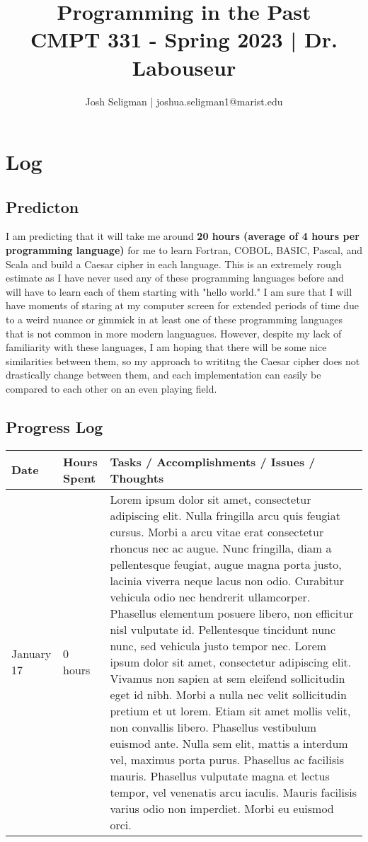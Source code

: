 \documentclass[letterpaper, 10pt, DIV=13]{scrartcl}
\title {
	\normalfont
	\huge{Programming in the Past} \\
	\vspace{10pt}
	\large{CMPT 331 - Spring 2023 | Dr. Labouseur}
}
\author{\normalfont Josh Seligman | joshua.seligman1@marist.edu}
\numberwithin{equation}{section}
\numberwithin{figure}{section}
\numberwithin{table}{section}
\begin{document}
\maketitle

\section{Log}
\subsection{Predicton}
I am predicting that it will take me around \textbf{20 hours (average of 4 hours per programming language)} for me to learn Fortran, COBOL, BASIC, Pascal, and Scala and build a Caesar cipher in each language. This is an extremely rough estimate as I have never used any of these programming languages before and will have to learn each of them starting with "hello world." I am sure that I will have moments of staring at my computer screen for extended periods of time due to a weird nuance or gimmick in at least one of these programming languages that is not common in more modern languagues. However, despite my lack of familiarity with these languages, I am hoping that there will be some nice similarities between them, so my approach to writitng the Caesar cipher does not drastically change between them, and each implementation can easily be compared to each other on an even playing field.

\subsection{Progress Log}
\begin{center}
	\begin{tabular}{|p{1in}|p{1in}|p{4in}|}
		\hline
		Date & Hours Spent & Tasks / Accomplishments / Issues / Thoughts \\
		\hline
		January 17 & 0 hours & Lorem ipsum dolor sit amet, consectetur adipiscing elit. Nulla fringilla arcu quis feugiat cursus. Morbi a arcu vitae erat consectetur rhoncus nec ac augue. Nunc fringilla, diam a pellentesque feugiat, augue magna porta justo, lacinia viverra neque lacus non odio. Curabitur vehicula odio nec hendrerit ullamcorper. Phasellus elementum posuere libero, non efficitur nisl vulputate id. Pellentesque tincidunt nunc nunc, sed vehicula justo tempor nec. Lorem ipsum dolor sit amet, consectetur adipiscing elit. Vivamus non sapien at sem eleifend sollicitudin eget id nibh. Morbi a nulla nec velit sollicitudin pretium et ut lorem. Etiam sit amet mollis velit, non convallis libero. Phasellus vestibulum euismod ante. Nulla sem elit, mattis a interdum vel, maximus porta purus. Phasellus ac facilisis mauris. Phasellus vulputate magna et lectus tempor, vel venenatis arcu iaculis. Mauris facilisis varius odio non imperdiet. Morbi eu euismod orci.  \\
		\hline
	\end{tabular}
\end{center}
\end{document}
